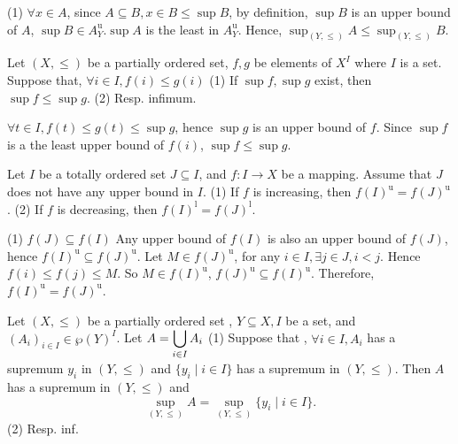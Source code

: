\begin{proofenv}
    \quad
    \newline
    (1) $\forall x\in A$, since $A\subseteq B, x\in B \le \sup B$, by definition,  $\sup B$ is an upper bound of $A$, $\sup B\in A_Y^\mathrm{u}$.$\sup A$ is the least in $A_Y^\mathrm{u}$. Hence, $\sup_{(Y, \le)}A \le \sup_{(Y, \le)}B$.
\end{proofenv}
\begin{propositionenv}\label{proposition4.5.3}
    Let $(X, \le )$ be a partially ordered set, $f, g$ be elements of $X^I$ where $I$ is a set. Suppose that, $\forall i\in  I , f(i)\le g(i)$
 \newline
 (1) If $\sup f, \sup g$ exist, then $\sup f\le\sup g$.
 \newline
 (2) Resp. infimum.
\end{propositionenv}
\begin{proofenv}
    $\forall t\in I, f(t)\le g(t)\le \sup g$, hence $\sup g$ is an upper bound of $f$. Since $\sup f $ is a the least upper bound of $f(i)$, $\sup f\le\sup g$.
\end{proofenv}
\begin{propositionenv}
    Let $I$ be a totally ordered set $J\subseteq I $, and $f:I\rightarrow X $ be a mapping. Assume that $J$ does not have any upper bound in $I$.
    \newline 
    (1) If $f$ is increasing,  then $f(I)^\mathrm{u}=f(J)^\mathrm{u}$.
    \newline
    (2) If $f$ is decreasing,  then $f(I)^\mathrm{l}=f(J)^\mathrm{l}$.
\end{propositionenv}
\begin{proofenv}
    \quad 
    \newline
    (1) $f(J)\subseteq f(I)$ Any upper bound of $f(I)$ is also an upper bound of $f(J)$, hence $f(I)^\mathrm{u}\subseteq f(J)^\mathrm{u}$. Let $M\in f(J)^\mathrm{u}$, for any $i\in I, \exists j\in J, i<j$. Hence $f(i)\le f(j)\le M$. So $M\in f(I)^\mathrm{u}$, $f(J)^\mathrm{u}\subseteq f(I)^\mathrm{u}$. Therefore, $f(I)^\mathrm{u}=f(J)^\mathrm{u}$.
\end{proofenv}
\begin{propositionenv}
    Let $(X, \le)$ be a partially ordered set , $Y\subseteq X, I$ be a set,  and $(A_i)_{i\in I}\in \wp (Y)^I$. Let $\displaystyle A=\bigcup _{i\in I}A_i$
    \newline
    (1) Suppose that , $\forall i \in I, A_i$ has a supremum $y_i$ in $(Y, \le)$ and $\{y_i\mid i\in I\}$ has a supremum in $(Y, \le)$. Then $A$ has a supremum in $(Y, \le )$ and $$\sup_{(Y, \le)}A=\sup_{(Y, \le)}\{y_i\mid i\in I\}.$$
    \newline
    (2) Resp. inf.
\end{propositionenv}
